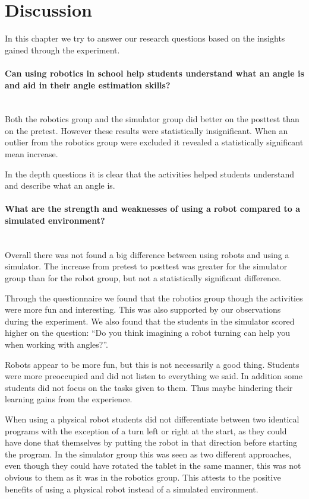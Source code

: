 \section{Discussion}
In this chapter we try to answer our research questions based on the insights gained through the experiment. 

\paragraph{Can using robotics in school help students understand what an angle is and aid in their angle estimation skills?}~\\
Both the robotics group and the simulator group did better on the posttest than on the pretest. However these results were statistically insignificant. When an outlier from the robotics group were excluded it revealed a statistically significant mean increase. 

In the depth questions it is clear that the activities helped students understand and describe what an angle is. 

\paragraph{What are the strength and weaknesses of using a robot compared to a simulated environment?}~\\
Overall there was not found a big difference between using robots and using a simulator.
The increase from pretest to posttest was greater for the simulator group than for the robot group, but not a statistically significant difference. 

Through the questionnaire we found that the robotics group though the activities were more fun and interesting. This was also supported by our observations during the experiment. We also found that the students in the simulator scored higher on the question: ``Do you think imagining a robot turning can help you
when working with angles?''. 

Robots appear to be more fun, but this is not necessarily a good thing. Students were more preoccupied and did not listen to everything we said. In addition some students did not focus on the tasks given to them. Thus maybe hindering their learning gains from the experience. 

When using a physical robot students did not differentiate between two identical programs with the exception of a turn left or right at the start, as they could have done that themselves by putting the robot in that direction before starting the program. In the simulator group this was seen as two different approaches, even though they could have rotated the tablet in the same manner, this was not obvious to them as it was in the robotics group. This attests to the positive benefits of using a physical robot instead of a simulated environment. 

